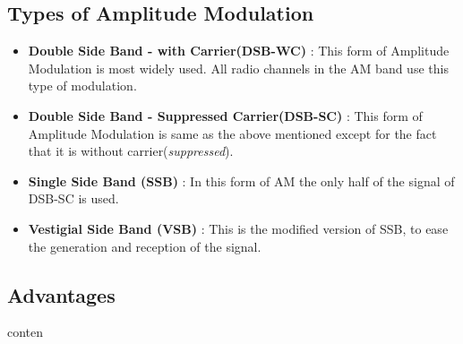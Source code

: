\documentclass[12pt,a4paper]{article}%
\begin{document}
\begin{flushleft}
		\subsection{Types of Amplitude Modulation}
		\begin{flushleft}
			\begin{itemize}
				\item{\textbf{Double Side Band - with Carrier(DSB-WC)} : This form of Amplitude Modulation is most widely used. All radio channels in the AM band use this type of modulation.}
				\item{\textbf{Double Side Band - Suppressed Carrier(DSB-SC)} : This form of Amplitude Modulation is same as the above mentioned except for the fact that it is without carrier(\textit{suppressed}).}
				\item{\textbf{Single Side Band (SSB)} : In this form of AM the only half of the signal of DSB-SC is used.}
				\item{\textbf{Vestigial Side Band (VSB)} : This is the modified version of SSB, to ease the generation and reception of the signal.}
			\end{itemize}
		\end{flushleft}
		\subsection{Advantages}
		\begin{flushleft}
			conten
		\end{flushleft}
	\end{flushleft}
	\pagebreak
\end{document}

